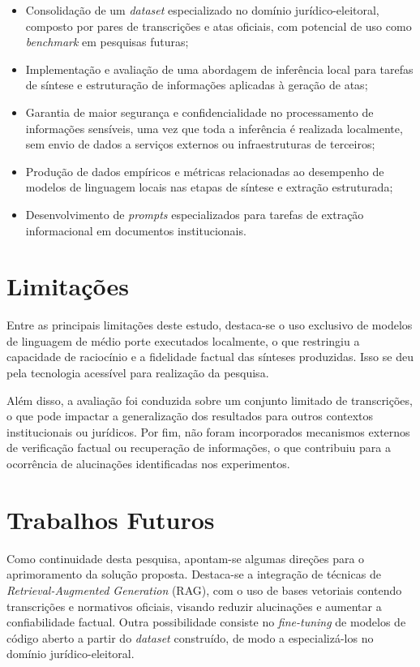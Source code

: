 \begin{itemize}
	\item Consolidação de um \textit{dataset} especializado no domínio jurídico-eleitoral, composto por pares de transcrições e atas oficiais, com potencial de uso como \textit{benchmark} em pesquisas futuras;
	\item Implementação e avaliação de uma abordagem de inferência local para tarefas de síntese e estruturação de informações aplicadas à geração de atas;
	\item Garantia de maior segurança e confidencialidade no processamento de informações sensíveis, uma vez que toda a inferência é realizada localmente, sem envio de dados a serviços externos ou infraestruturas de terceiros;
	\item Produção de dados empíricos e métricas relacionadas ao desempenho de modelos de linguagem locais nas etapas de síntese e extração estruturada;
	\item Desenvolvimento de \textit{prompts} especializados para tarefas de extração informacional em documentos institucionais.
\end{itemize}

\section{Limitações}
\label{sec:limitacoes}

Entre as principais limitações deste estudo, destaca-se o uso exclusivo de modelos de linguagem de médio porte executados localmente, o que restringiu a capacidade de raciocínio e a fidelidade factual das sínteses produzidas. Isso se deu pela tecnologia acessível para realização da pesquisa.

Além disso, a avaliação foi conduzida sobre um conjunto limitado de transcrições, o que pode impactar a generalização dos resultados para outros contextos institucionais ou jurídicos. Por fim, não foram incorporados mecanismos externos de verificação factual ou recuperação de informações, o que contribuiu para a ocorrência de alucinações identificadas nos experimentos.

\section{Trabalhos Futuros}
\label{sec:trabalhos-futuros}

Como continuidade desta pesquisa, apontam-se algumas direções para o aprimoramento da solução proposta. Destaca-se a integração de técnicas de \textit{Retrieval-Augmented Generation} (RAG), com o uso de bases vetoriais contendo transcrições e normativos oficiais, visando reduzir alucinações e aumentar a confiabilidade factual. Outra possibilidade consiste no \textit{fine-tuning} de modelos de código aberto a partir do \textit{dataset} construído, de modo a especializá-los no domínio jurídico-eleitoral.

